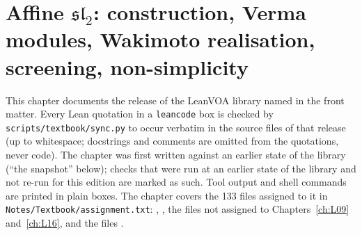 \chapter[Affine \texorpdfstring{$\mathfrak{sl}_2$}{sl(2)}: construction, Wakimoto, Verma, Kac]{Affine \texorpdfstring{$\mathfrak{sl}_2$}{sl(2)}: construction, Verma modules, Wakimoto realisation, screening, non-simplicity}\label{ch:L08}
\begingroup\setlength{\emergencystretch}{3em}\sloppy

\providecommand{\leightsl}{\mathfrak{sl}_2}
\providecommand{\leighthat}{\widehat{\mathfrak{sl}}_2}
\providecommand{\leightvac}{|0\rangle}
\providecommand{\leightV}{\mathcal{V}}
\providecommand{\leightU}{\mathcal{U}}
\providecommand{\leightad}{\operatorname{ad}}
\providecommand{\leightM}{\mathcal{M}}
\providecommand{\leightFock}{\mathcal{F}}

This chapter documents the release of the LeanVOA library named in the front matter. Every Lean quotation in a \texttt{leancode} box is checked by
\texttt{scripts/textbook/sync.py} to occur verbatim in the source files of that release (up to
whitespace; docstrings and comments are omitted from the quotations, never code). The chapter was first
written against an earlier state of the library (``the snapshot'' below); checks that were run at an earlier state of the library and not re-run for this edition are marked as such. Tool output and shell
commands are
printed in plain boxes. The chapter covers the 133 files assigned to it in
\texttt{Notes/Textbook/assignment.txt}: ,
, the files 
not assigned to Chapters~\ref{ch:L09} and~\ref{ch:L16}, and the files
.

